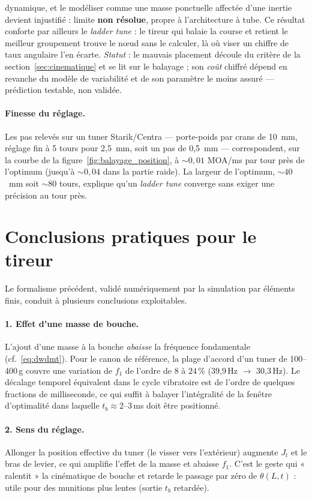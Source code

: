 \documentclass[12pt,a4paper]{article}
\begin{document}
dynamique, et le mod\'eliser comme une masse ponctuelle affect\'ee d'une inertie devient injustifi\'e : limite \textbf{non r\'esolue}, propre \`a l'architecture \`a tube. Ce r\'esultat conforte par ailleurs le \emph{ladder tune} : le tireur qui balaie la course et retient le meilleur groupement trouve le n\oe{}ud sans le calculer, l\`a o\`u viser un chiffre de taux angulaire l'en \'ecarte. \emph{Statut} : le mauvais placement d\'ecoule du crit\`ere de la section~\ref{sec:cinematique} et se lit sur le balayage ; son \emph{co\^ut} chiffr\'e d\'epend en revanche du mod\`ele de variabilit\'e et de son param\`etre le moins assur\'e --- pr\'ediction testable, non valid\'ee.

	\paragraph{Finesse du réglage.} Les pas relevés sur un tuner Starik/Centra --- porte-poids par crans de 10~mm, réglage fin à 5 tours pour 2,5~mm, soit un pas de 0,5~mm --- correspondent, sur la courbe de la figure~\ref{fig:balayage_position}, à $\sim 0{,}01$ MOA/ms par tour près de l'optimum (jusqu'à $\sim 0{,}04$ dans la partie raide). La largeur de l'optimum, $\sim 40$~mm soit $\sim 80$ tours, explique qu'un \emph{ladder tune} converge sans exiger une précision au tour près.

	\section{Conclusions pratiques pour le tireur}
	\label{sec:conclusions}

	Le formalisme précédent, validé numériquement par la simulation par éléments finis, conduit à plusieurs conclusions exploitables.

	\paragraph{1. Effet d'une masse de bouche.} L'ajout d'une masse à la bouche \emph{abaisse} la fréquence fondamentale (cf.\ \eqref{eq:dwdmt}). Pour le canon de référence, la plage d'accord d'un tuner de 100--400\,g couvre une variation de $f_1$ de l'ordre de $8$ à $24\,\%$ (39{,}9\,Hz $\to$ 30{,}3\,Hz). Le décalage temporel équivalent dans le cycle vibratoire est de l'ordre de quelques fractions de milliseconde, ce qui suffit à balayer l'intégralité de la fenêtre d'optimalité dans laquelle $t_b \approx 2$--$3$\,ms doit être positionné.

	\paragraph{2. Sens du réglage.} Allonger la position effective du tuner (le visser vers l'extérieur) augmente $J_t$ et le bras de levier, ce qui amplifie l'effet de la masse et abaisse $f_1$. C'est le geste qui « ralentit » la cinématique de bouche et retarde le passage par zéro de $\theta(L,t)$ : utile pour des munitions plus lentes (sortie $t_b$ retardée).
\end{document}
